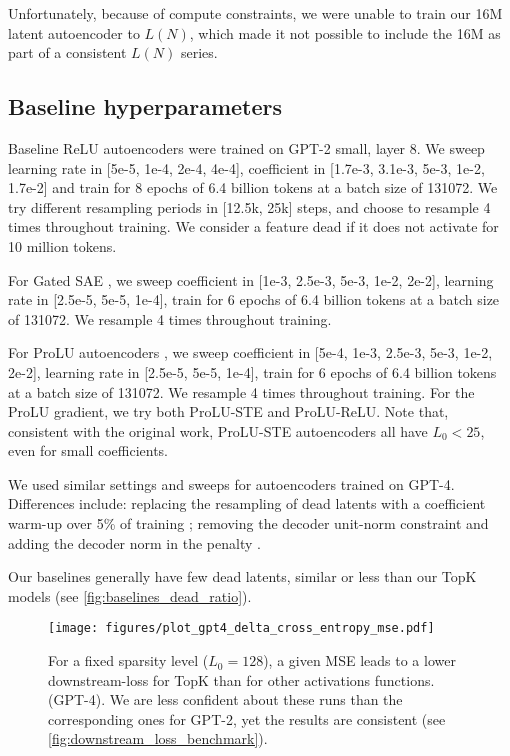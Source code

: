 Unfortunately, because of compute constraints, we were unable to train our 16M latent autoencoder to $L(N)$, which made it not possible to include the 16M as part of a consistent $L(N)$ series.

\subsection{Baseline hyperparameters}
\label{sec:baseline-relu}
Baseline ReLU autoencoders were trained on GPT-2 small, layer 8. 
We sweep learning rate in [5e-5, 1e-4, 2e-4, 4e-4], \Lone coefficient in [1.7e-3, 3.1e-3, 5e-3, 1e-2, 1.7e-2] and train for 8 epochs of 6.4 billion tokens at a batch size of 131072. We try different resampling periods in [12.5k, 25k] steps, and choose to resample 4 times throughout training. We consider a feature dead if it does not activate for 10 million tokens. 

For Gated SAE \citep{rajamanoharan2024improving}, we sweep \Lone coefficient in [1e-3, 2.5e-3, 5e-3, 1e-2, 2e-2], learning rate in [2.5e-5, 5e-5, 1e-4], train for 6 epochs of 6.4 billion tokens at a batch size of 131072. We resample 4 times throughout training.

For ProLU autoencoders \citep{taggart2024prolu}, we sweep \Lone coefficient in [5e-4, 1e-3, 2.5e-3, 5e-3, 1e-2, 2e-2], learning rate in [2.5e-5, 5e-5, 1e-4], train for 6 epochs of 6.4 billion tokens at a batch size of 131072. We resample 4 times throughout training. For the ProLU gradient, we try both ProLU-STE and ProLU-ReLU.  %
Note that, consistent with the original work, ProLU-STE autoencoders all have $L_0 < 25$, even for small \Lone coefficients.

We used similar settings and sweeps for autoencoders trained on GPT-4.
Differences include: replacing the resampling of dead latents with a \Lone coefficient warm-up over 5\% of training \citep{conerly2024update}; removing the decoder unit-norm constraint and adding the decoder norm in the \Lone penalty \citep{conerly2024update}.

Our baselines generally have few dead latents, similar or less than our TopK models (see \autoref{fig:baselines_dead_ratio}).  

\begin{figure}
    \centering
    \texttt{[image: figures/plot\_gpt4\_delta\_cross\_entropy\_mse.pdf]}%
    \caption{For a fixed sparsity level ($L_0 = 128$), a given MSE leads to a lower downstream-loss for TopK than for other activations functions. (GPT-4). We are less confident about these runs than the corresponding ones for GPT-2, yet the results are consistent (see \autoref{fig:downstream_loss_benchmark}).}
    \label{fig:downstream_loss_benchmark_gpt4}
\end{figure}


